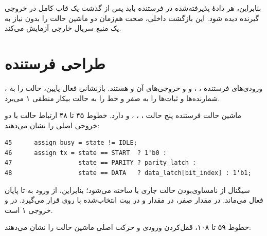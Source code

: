 بنابراین، هر دادهٔ پذیرفته‌شده در فرستنده باید پس از گذشت یک قاب کامل در خروجی گیرنده
دیده شود. این بازگشت داخلی، صحت هم‌زمان دو ماشین حالت را بدون نیاز به یک منبع سریال
خارجی آزمایش می‌کند.


\section{طراحی فرستنده}

ورودی‌های فرستنده ، ،  و
 و خروجی‌های آن  و  هستند. بازنشانی
فعال-پایین، حالت را به ، شمارنده‌ها و ثبات‌ها را به صفر و خط  را به
حالت بیکار منطقی ۱ می‌برد.

ماشین حالت فرستنده پنج حالت ، ، ،  و
 دارد. خطوط ۴۵ تا ۴۸ ارتباط حالت با دو خروجی اصلی را نشان می‌دهند:

\begin{dsdlcodeblock}
\begin{verbatim}
45      assign busy = state != IDLE;
46      assign tx = state == START  ? 1'b0 :
47                  state == PARITY ? parity_latch :
48                  state == DATA   ? data_latch[bit_index] : 1'b1;
\end{verbatim}
\end{dsdlcodeblock}

سیگنال  از نامساوی‌بودن حالت جاری با  ساخته می‌شود؛ بنابراین، از ورود
به  تا پایان  فعال می‌ماند. در  مقدار صفر، در
 مقدار  و در  بیت انتخاب‌شده با
 روی  قرار می‌گیرد. در  و  خروجی ۱ است.

خطوط ۵۹ تا ۱۰۸، قفل‌کردن ورودی و حرکت اصلی ماشین حالت را نشان می‌دهند:

